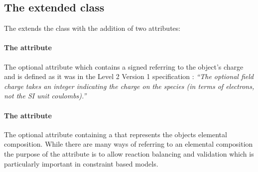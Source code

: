 \subsection{The extended  class}
\label{species-class}

The \FBCPackage extends the \sbmlthreecore \Species class with the addition
of two attributes:

\paragraph{The  attribute}
The optional attribute  which contains a signed
 referring to the \Species object's charge and is
defined as it was in the \SBML Level 2 Version 1 specification
: \textit{``The optional field charge takes an integer indicating
the charge on the species (in terms of electrons, not the SI unit coulombs).''}

\paragraph{The  attribute}
\label{chemicalFormula-attribute}
The optional attribute  containing a
 that represents the \Species objects elemental
composition.
%
%
While there are many ways of referring to an elemental composition the purpose of the  attribute is to allow reaction balancing and validation which is particularly important in constraint based models.

